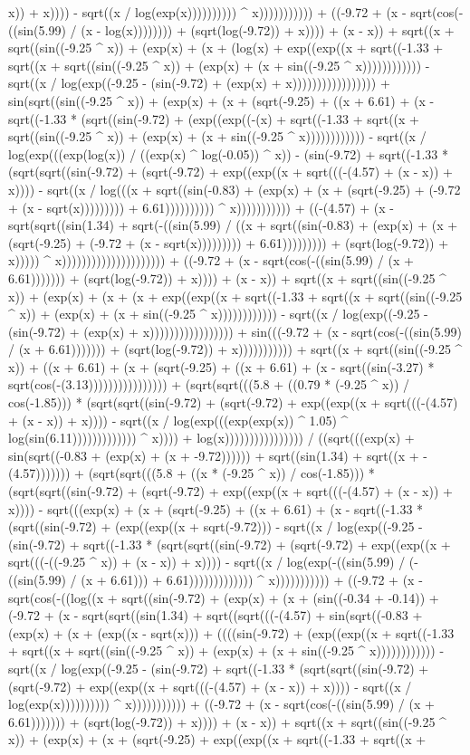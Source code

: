 x)) + x)))) - sqrt((x / log(exp(x)))))))))) ^ x))))))))))) + ((-9.72 + (x - sqrt(cos(-((sin(5.99) / (x - log(x)))))))) + (sqrt(log(-9.72)) + x)))) + (x - x)) + sqrt((x + sqrt((sin((-9.25 ^ x)) + (exp(x) + (x + (log(x) + exp((exp((x + sqrt((-1.33 + sqrt((x + sqrt((sin((-9.25 ^ x)) + (exp(x) + (x + sin((-9.25 ^ x)))))))))))) - sqrt((x / log(exp((-9.25 - (sin(-9.72) + (exp(x) + x))))))))))))))))) + sin(sqrt((sin((-9.25 ^ x)) + (exp(x) + (x + (sqrt(-9.25) + ((x + 6.61) + (x - sqrt((-1.33 * (sqrt((sin(-9.72) + (exp((exp((-(x) + sqrt((-1.33 + sqrt((x + sqrt((sin((-9.25 ^ x)) + (exp(x) + (x + sin((-9.25 ^ x)))))))))))) - sqrt((x / log(exp(((exp(log(x)) / ((exp(x) ^ log(-0.05)) ^ x)) - (sin(-9.72) + sqrt((-1.33 * (sqrt(sqrt((sin(-9.72) + (sqrt(-9.72) + exp((exp((x + sqrt(((-(4.57) + (x - x)) + x)))) - sqrt((x / log(((x + sqrt((sin(-0.83) + (exp(x) + (x + (sqrt(-9.25) + (-9.72 + (x - sqrt(x))))))))) + 6.61)))))))))) ^ x))))))))))) + ((-(4.57) + (x - sqrt(sqrt((sin(1.34) + sqrt(-((sin(5.99) / ((x + sqrt((sin(-0.83) + (exp(x) + (x + (sqrt(-9.25) + (-9.72 + (x - sqrt(x))))))))) + 6.61))))))))) + (sqrt(log(-9.72)) + x))))) ^ x))))))))))))))))))))) + ((-9.72 + (x - sqrt(cos(-((sin(5.99) / (x + 6.61))))))) + (sqrt(log(-9.72)) + x)))) + (x - x)) + sqrt((x + sqrt((sin((-9.25 ^ x)) + (exp(x) + (x + (x + exp((exp((x + sqrt((-1.33 + sqrt((x + sqrt((sin((-9.25 ^ x)) + (exp(x) + (x + sin((-9.25 ^ x)))))))))))) - sqrt((x / log(exp((-9.25 - (sin(-9.72) + (exp(x) + x))))))))))))))))) + sin(((-9.72 + (x - sqrt(cos(-((sin(5.99) / (x + 6.61))))))) + (sqrt(log(-9.72)) + x))))))))))) + sqrt((x + sqrt((sin((-9.25 ^ x)) + ((x + 6.61) + (x + (sqrt(-9.25) + ((x + 6.61) + (x - sqrt((sin(-3.27) * sqrt(cos(-(3.13)))))))))))))))) + (sqrt(sqrt(((5.8 + ((0.79 * (-9.25 ^ x)) / cos(-1.85))) * (sqrt(sqrt((sin(-9.72) + (sqrt(-9.72) + exp((exp((x + sqrt(((-(4.57) + (x - x)) + x)))) - sqrt((x / log(exp(((exp(exp(x)) ^ 1.05) ^ log(sin(6.11))))))))))))) ^ x)))) + log(x)))))))))))))))) / ((sqrt(((exp(x) + sin(sqrt((-0.83 + (exp(x) + (x + -9.72)))))) + sqrt((sin(1.34) + sqrt((x + -(4.57))))))) + (sqrt(sqrt(((5.8 + ((x * (-9.25 ^ x)) / cos(-1.85))) * (sqrt(sqrt((sin(-9.72) + (sqrt(-9.72) + exp((exp((x + sqrt(((-(4.57) + (x - x)) + x)))) - sqrt(((exp(x) + (x + (sqrt(-9.25) + ((x + 6.61) + (x - sqrt((-1.33 * (sqrt((sin(-9.72) + (exp((exp((x + sqrt(-9.72))) - sqrt((x / log(exp((-9.25 - (sin(-9.72) + sqrt((-1.33 * (sqrt(sqrt((sin(-9.72) + (sqrt(-9.72) + exp((exp((x + sqrt(((-((-9.25 ^ x)) + (x - x)) + x)))) - sqrt((x / log(exp(-((sin(5.99) / (-((sin(5.99) / (x + 6.61))) + 6.61))))))))))))) ^ x))))))))))) + ((-9.72 + (x - sqrt(cos(-((log((x + sqrt((sin(-9.72) + (exp(x) + (x + (sin((-0.34 + -0.14)) + (-9.72 + (x - sqrt(sqrt((sin(1.34) + sqrt((sqrt(((-(4.57) + sin(sqrt((-0.83 + (exp(x) + (x + (exp((x - sqrt(x))) + ((((sin(-9.72) + (exp((exp((x + sqrt((-1.33 + sqrt((x + sqrt((sin((-9.25 ^ x)) + (exp(x) + (x + sin((-9.25 ^ x)))))))))))) - sqrt((x / log(exp((-9.25 - (sin(-9.72) + sqrt((-1.33 * (sqrt(sqrt((sin(-9.72) + (sqrt(-9.72) + exp((exp((x + sqrt(((-(4.57) + (x - x)) + x)))) - sqrt((x / log(exp(x)))))))))) ^ x))))))))))) + ((-9.72 + (x - sqrt(cos(-((sin(5.99) / (x + 6.61))))))) + (sqrt(log(-9.72)) + x)))) + (x - x)) + sqrt((x + sqrt((sin((-9.25 ^ x)) + (exp(x) + (x + (sqrt(-9.25) + exp((exp((x + sqrt((-1.33 + sqrt((x + 